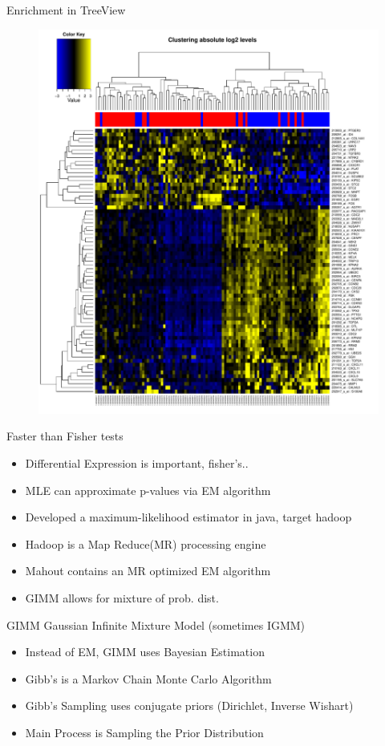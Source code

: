 \documentclass{beamer}
\begin{document}
\begin{frame}{Enrichment in TreeView}
 \begin{figure}
  \centering \includegraphics[scale=.20]{doc/diffexpress}
\end{figure}
\end{frame}
\begin{frame}{Faster than Fisher tests}
 \begin{itemize}
  \item Differential Expression is important, fisher's..
  \item MLE can approximate p-values via EM algorithm
  \item Developed a maximum-likelihood estimator in java, target hadoop
  \item Hadoop is a Map Reduce(MR) processing engine
  \item Mahout contains an MR optimized EM algorithm
  \item GIMM allows for mixture of prob. dist.
 \end{itemize}
\end{frame}

\begin{frame}{GIMM}
 Gaussian Infinite Mixture Model (sometimes IGMM)
 \begin{itemize}
  \item Instead of EM, GIMM uses Bayesian Estimation
  \item Gibb's is a Markov Chain Monte Carlo Algorithm
  \item Gibb's Sampling uses conjugate priors (Dirichlet, Inverse Wishart)
  \item Main Process is Sampling the Prior Distribution
 \end{itemize}
\end{frame}
\end{document}
